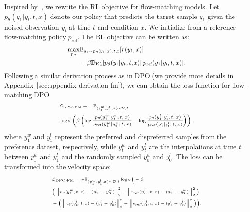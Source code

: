 \documentclass[11pt]{article}
\begin{document}
Inspired by~\citet{wallace2024diffusion}, we rewrite the RL objective for flow-matching models. Let $p_\theta(y_1|y_t,t,x)$ denote our policy that predicts the target sample $y_1$ given the noised observation $y_t$ at time $t$ and condition $x$. We initialize from a reference flow-matching policy $p_{\text{ref}}$. The RL objective can be written as:
\begin{equation}
{\small
\begin{aligned}
\max_{p_\theta} & \mathbb{E}_{y_1 \sim p_\theta(y_1|x), t, x}[r(y_1,x)] \\
& - \beta \mathbb{D}_{\text{KL}}[p_\theta(y_1|y_t,t,x) \| p_{\text{ref}}(y_1|y_t,t,x)].
\end{aligned}
}
\label{eq:rl_obj_fm}
\end{equation}
Following a similar derivation process as in DPO (we provide more details in Appendix~\ref{sec:appendix-derivation-fm}), we can obtain the loss function for flow-matching DPO:
\begin{equation}
{\scriptsize
\begin{aligned}
& \mathcal{L}_{\text{DPO-FM}} = -
\mathbb{E}_{(y_1^w, y_1^l, x) \sim \mathcal{D}, t} \\
& \log \sigma \left( \beta \left( \log \frac{p_\theta(y_1^w|y_t^w,t,x)}{p_{\text{ref}}(y_1^w|y_t^w,t,x)}
- \log \frac{p_\theta(y_1^l|y_t^l,t,x)}{p_{\text{ref}}(y_1^l|y_t^l,t,x)} \right) \right),
\end{aligned}
}
\label{eq:dpo-fm}
\end{equation}
where $y_1^w$ and $y_1^l$ represent the preferred and dispreferred samples from the preference dataset, respectively, while $y_t^w$ and $y_t^l$ are the interpolations at time $t$ between $y_1^w$ and $y_1^l$ and the randomly sampled $y_0^w$ and $y_0^l$. The loss can be transformed into the velocity space:
\vspace{-2mm}
\begin{equation}
{\tiny
\begin{split}
& \mathcal{L}_{\text{DPO-FM}} = -\mathbb{E}_{(y_1^w, y_1^l, x) \sim \mathcal{D}, t} \log \sigma \Big( -\beta \\
& \Big( \left\| v_\theta(y^w_t, t, x) - (y_1^w - y_0^w) \right\|_2^2
- \left\| v_\text{ref}(y^w_t, t, x) - (y_1^w - y_0^w) \right\|_2^2 \Big) \\
& - \Big( \left\| v_\theta(y^l_t, t, x) - (y_1^l - y_0^l) \right\|_2^2
- \left\| v_\text{ref}(y^l_t, t, x) - (y_1^l -y_0^l) \right\|_2^2 \Big) \Big).
\end{split}
}
\label{eq:dpo-fm-velocity}
\end{equation}
\end{document}
